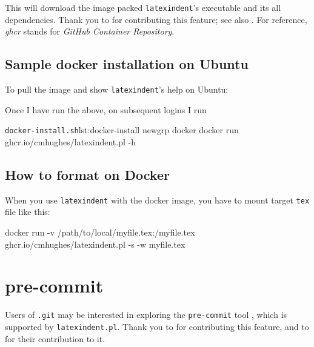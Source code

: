   This will download the image packed \texttt{latexindent}'s executable and its all
  dependencies.  Thank you to \cite{eggplants} for contributing this
  feature; see also \cite{cmhughesio}. For reference, \emph{ghcr} stands for \emph{GitHub
  Container Repository}.

 \subsection{Sample docker installation on Ubuntu}
  To pull the image and show \texttt{latexindent}'s help on Ubuntu:


  Once I have run the above, on subsequent logins I run
  \begin{cmhlistings}[style=tcblatex,language=Bash]{\texttt{docker-install.sh}}{lst:docker-install}
newgrp docker
docker run ghcr.io/cmhughes/latexindent.pl -h
\end{cmhlistings}

 \subsection{How to format on Docker}
  When you use \texttt{latexindent} with the docker image, you have to mount target \texttt{tex} file like this:

  \begin{commandshell}
docker run -v /path/to/local/myfile.tex:/myfile.tex ghcr.io/cmhughes/latexindent.pl -s -w myfile.tex
\end{commandshell}

 \section{pre-commit}

  Users of \texttt{.git} may be interested  in exploring the \texttt{pre-commit} tool \cite{pre-commithome}, which
  is supported by \texttt{latexindent.pl}. Thank you to \cite{tdegeusprecommit} for
  contributing this feature, and to \cite{holzhausprecommit} for their contribution to
  it.

